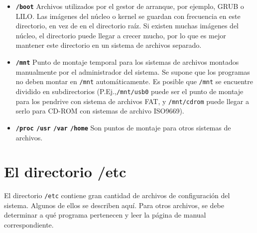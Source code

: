 \documentclass[12pt]{article}
\begin{document}
\begin{itemize}
	
	\item \textbf{\texttt{/boot}}
	 Archivos utilizados por el gestor de arranque, por
	ejemplo, GRUB o LILO. Las imágenes del núcleo o kernel se guardan con
	frecuencia en este directorio, en vez de en el directorio raíz. Si
	existen	muchas imágenes del núcleo, el directorio puede
	llegar a crecer mucho, por lo que es mejor mantener este
	directorio en un sistema de archivos separado. 
	
	\item \textbf{\texttt{/mnt}}
	 Punto de montaje temporal para los sistemas de archivos
	montados manualmente por el administrador del sistema. Se supone que los programas
	no deben montar en \texttt{/mnt} automáticamente. Es posible
	que \texttt{/mnt} se encuentre dividido en subdirectorios
	(P.Ej.,\texttt{/mnt/usb0} puede ser
	el punto de montaje para los pendrive con sistema de archivos
	FAT, y \texttt{/mnt/cdrom} puede llegar a serlo para CD-ROM con sistemas
	de archivo ISO9669).  
	
	\item \textbf{\texttt{/proc}
	\texttt{/usr} \texttt{/var}
	\texttt{/home} } Son puntos de
	montaje para otros sistemas de archivos.
 \end{itemize}  




\section{ El directorio /etc}

 El directorio \texttt{/etc} contiene gran cantidad de
archivos de configuración del sistema. Algunos de ellos se describen aquí. 
Para otros archivos, se
debe determinar a qué programa pertenecen y leer la página de manual
correspondiente.  
\end{document}

